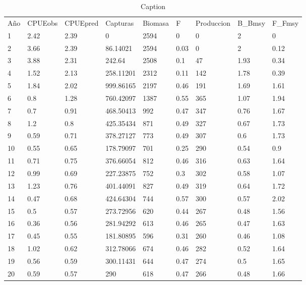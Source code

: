\documentclass{uofa-eng-assignment}
\begin{document}
\begin{table}[H]
\caption{Caption}
\begin{tabular}{lllllllll}
Año & CPUEobs & CPUEpred & Capturas  & Biomasa & F    & Produccion & B\_Bmsy & F\_Fmsy \\
1   & 2.42    & 2.39     & 0         & 2594    & 0    & 0          & 2       & 0       \\
2   & 3.66    & 2.39     & 86.14021  & 2594    & 0.03 & 0          & 2       & 0.12    \\
3   & 3.88    & 2.31     & 242.64    & 2508    & 0.1  & 47         & 1.93    & 0.34    \\
4   & 1.52    & 2.13     & 258.11201 & 2312    & 0.11 & 142        & 1.78    & 0.39    \\
5   & 1.84    & 2.02     & 999.86165 & 2197    & 0.46 & 191        & 1.69    & 1.61    \\
6   & 0.8     & 1.28     & 760.42097 & 1387    & 0.55 & 365        & 1.07    & 1.94    \\
7   & 0.7     & 0.91     & 468.50413 & 992     & 0.47 & 347        & 0.76    & 1.67    \\
8   & 1.2     & 0.8      & 425.35434 & 871     & 0.49 & 327        & 0.67    & 1.73    \\
9   & 0.59    & 0.71     & 378.27127 & 773     & 0.49 & 307        & 0.6     & 1.73    \\
10  & 0.55    & 0.65     & 178.79097 & 701     & 0.25 & 290        & 0.54    & 0.9     \\
11  & 0.71    & 0.75     & 376.66054 & 812     & 0.46 & 316        & 0.63    & 1.64    \\
12  & 0.99    & 0.69     & 227.23875 & 752     & 0.3  & 302        & 0.58    & 1.07    \\
13  & 1.23    & 0.76     & 401.44091 & 827     & 0.49 & 319        & 0.64    & 1.72    \\
14  & 0.47    & 0.68     & 424.64304 & 744     & 0.57 & 300        & 0.57    & 2.02    \\
15  & 0.5     & 0.57     & 273.72956 & 620     & 0.44 & 267        & 0.48    & 1.56    \\
16  & 0.36    & 0.56     & 281.94292 & 613     & 0.46 & 265        & 0.47    & 1.63    \\
17  & 0.45    & 0.55     & 181.80895 & 596     & 0.31 & 260        & 0.46    & 1.08    \\
18  & 1.02    & 0.62     & 312.78066 & 674     & 0.46 & 282        & 0.52    & 1.64    \\
19  & 0.56    & 0.59     & 300.11431 & 644     & 0.47 & 274        & 0.5     & 1.65    \\
20  & 0.59    & 0.57     & 290       & 618     & 0.47 & 266        & 0.48    & 1.66   
\end{tabular}
\end{table}
\end{document}
